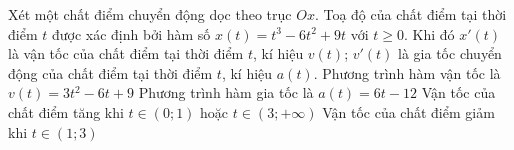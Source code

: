 \begin{ex}
	Xét một chất điểm chuyển động dọc theo trục $Ox$. Toạ độ của chất điểm tại thời điểm $t$ được xác định bởi hàm số $x(t)=t^3-6t^2+9t$ với $t\geq 0$. Khi đó $x'(t)$ là vận tốc của chất điểm tại thời điểm $t$, kí hiệu $v(t)$; $v'(t)$ là gia tốc chuyển động của chất điểm tại thời điểm $t$, kí hiệu $a(t)$.
	\choiceTF
	{Phương trình hàm vận tốc là $v(t)=3t^2-6t+9$}
	{\True Phương trình hàm gia tốc là $a(t)=6t-12$}
	{Vận tốc của chất điểm tăng khi $t\in (0;1)$ hoặc  $t \in (3;+\infty)$}
	{Vận tốc của chất điểm giảm khi $t\in (1;3)$}
\end{ex} 

